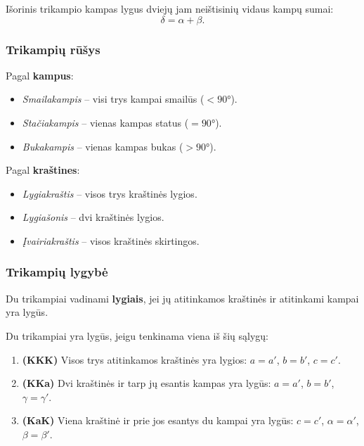 \begin{corollary}
Išorinis trikampio kampas lygus dviejų jam neištisinių vidaus kampų sumai:
\[
\delta = \alpha + \beta.
\]
\end{corollary}

\subsubsection*{Trikampių rūšys}

Pagal \textbf{kampus}:
\begin{itemize}
  \item \textit{Smailakampis} – visi trys kampai smailūs ($< 90°$).
  \item \textit{Stačiakampis} – vienas kampas status ($= 90°$).
  \item \textit{Bukakampis} – vienas kampas bukas ($> 90°$).
\end{itemize}

Pagal \textbf{kraštines}:
\begin{itemize}
  \item \textit{Lygiakraštis} – visos trys kraštinės lygios.
  \item \textit{Lygiašonis} – dvi kraštinės lygios.
  \item \textit{Įvairiakraštis} – visos kraštinės skirtingos.
\end{itemize}

\subsubsection*{Trikampių lygybė}

\begin{definition}
Du trikampiai vadinami \textbf{lygiais}, jei jų atitinkamos kraštinės ir atitinkami kampai
yra lygūs.
\end{definition}

\begin{theorem}
Du trikampiai yra lygūs, jeigu tenkinama viena iš šių sąlygų:
\begin{enumerate}
  \item \textbf{(KKK)} Visos trys atitinkamos kraštinės yra lygios:
        $a = a'$, $b = b'$, $c = c'$.
  \item \textbf{(KKa)} Dvi kraštinės ir tarp jų esantis kampas yra lygūs:
        $a = a'$, $b = b'$, $\gamma = \gamma'$.
  \item \textbf{(KaK)} Viena kraštinė ir prie jos esantys du kampai yra lygūs:
        $c = c'$, $\alpha = \alpha'$, $\beta = \beta'$.
\end{enumerate}
\end{theorem}

